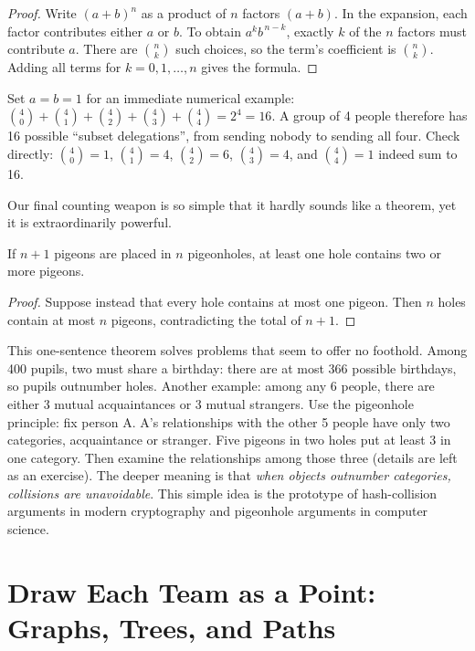 \begin{proof}
Write $(a+b)^n$ as a product of $n$ factors $(a+b)$. In the expansion, each factor contributes either $a$ or $b$. To obtain $a^k b^{\,n-k}$, exactly $k$ of the $n$ factors must contribute $a$. There are $\binom{n}{k}$ such choices, so the term's coefficient is $\binom{n}{k}$. Adding all terms for $k=0,1,\dots,n$ gives the formula.
\end{proof}

Set $a=b=1$ for an immediate numerical example: $\binom{4}{0}+\binom{4}{1}+\binom{4}{2}+\binom{4}{3}+\binom{4}{4}=2^4=16$. A group of 4 people therefore has 16 possible ``subset delegations'', from sending nobody to sending all four. Check directly: $\binom{4}{0}=1$, $\binom{4}{1}=4$, $\binom{4}{2}=6$, $\binom{4}{3}=4$, and $\binom{4}{4}=1$ indeed sum to 16.

Our final counting weapon is so simple that it hardly sounds like a theorem, yet it is extraordinarily powerful.

\begin{dingli}
If $n+1$ pigeons are placed in $n$ pigeonholes, at least one hole contains two or more pigeons.
\end{dingli}

\begin{proof}
Suppose instead that every hole contains at most one pigeon. Then $n$ holes contain at most $n$ pigeons, contradicting the total of $n+1$.
\end{proof}

This one-sentence theorem solves problems that seem to offer no foothold. Among 400 pupils, two must share a birthday: there are at most 366 possible birthdays, so pupils outnumber holes. Another example: among any 6 people, there are either 3 mutual acquaintances or 3 mutual strangers. Use the pigeonhole principle: fix person A. A's relationships with the other 5 people have only two categories, acquaintance or stranger. Five pigeons in two holes put at least 3 in one category. Then examine the relationships among those three (details are left as an exercise). The deeper meaning is that \emph{when objects outnumber categories, collisions are unavoidable}. This simple idea is the prototype of hash-collision arguments in modern cryptography and pigeonhole arguments in computer science.

\section{Draw Each Team as a Point: Graphs, Trees, and Paths}

